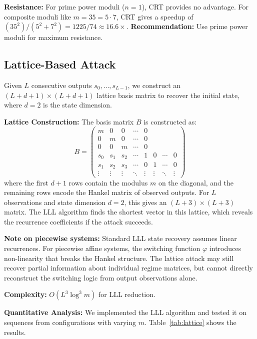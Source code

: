 \documentclass[11pt]{article}
\theoremstyle{plain}
\theoremstyle{definition}
\begin{document}
\textbf{Resistance:} For prime power moduli ($n=1$), CRT provides no advantage. For composite moduli like $m=35 = 5 \cdot 7$, CRT gives a speedup of $(35^2)/(5^2 + 7^2) = 1225/74 \approx 16.6\times$. \textbf{Recommendation:} Use prime power moduli for maximum resistance.

\subsection{Lattice-Based Attack}

Given $L$ consecutive outputs $s_0, \ldots, s_{L-1}$, we construct an $(L+d+1) \times (L+d+1)$ lattice basis matrix to recover the initial state, where $d=2$ is the state dimension.

\textbf{Lattice Construction:} The basis matrix $B$ is constructed as:
\begin{equation}
B = \begin{pmatrix}
m & 0 & 0 & \cdots & 0 \\
0 & m & 0 & \cdots & 0 \\
0 & 0 & m & \cdots & 0 \\
s_0 & s_1 & s_2 & \cdots & 1 & 0 & \cdots & 0 \\
s_1 & s_2 & s_3 & \cdots & 0 & 1 & \cdots & 0 \\
\vdots & \vdots & \vdots & \ddots & \vdots & \vdots & \ddots & \vdots
\end{pmatrix}
\end{equation}
where the first $d+1$ rows contain the modulus $m$ on the diagonal, and the remaining rows encode the Hankel matrix of observed outputs. For $L$ observations and state dimension $d=2$, this gives an $(L+3) \times (L+3)$ matrix. The LLL algorithm finds the shortest vector in this lattice, which reveals the recurrence coefficients if the attack succeeds.

\textbf{Note on piecewise systems:} Standard LLL state recovery assumes linear recurrences. For piecewise affine systems, the switching function $\varphi$ introduces non-linearity that breaks the Hankel structure. The lattice attack may still recover partial information about individual regime matrices, but cannot directly reconstruct the switching logic from output observations alone.

\textbf{Complexity:} $O(L^3 \log^3 m)$ for LLL reduction.

\textbf{Quantitative Analysis:} We implemented the LLL algorithm and tested it on sequences from configurations with varying $m$. Table~\ref{tab:lattice} shows the results.
\end{document}
